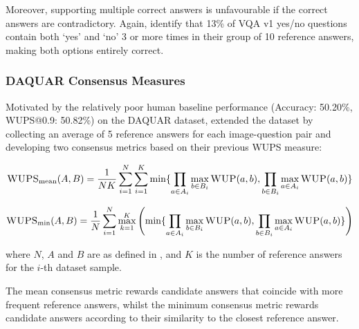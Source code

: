 Moreover, supporting multiple correct answers is unfavourable if the correct answers are contradictory. Again, \citeauthor{kafle2017visual} identify that 13\% of VQA v1 yes/no questions contain both `yes' and `no' 3 or more times in their group of 10 reference answers, making both options entirely correct.



\subsubsection{DAQUAR Consensus Measures}

Motivated by the relatively poor human baseline performance (Accuracy: 50.20\%, WUPS@0.9:  50.82\%) on the DAQUAR dataset, \citeauthor{malinowski2015ask} extended the dataset by collecting an average of 5 reference answers for each image-question pair and developing two consensus metrics based on their previous WUPS measure:

\begin{equation}
    \textsc{WUPS}_{\text{mean}}(A, B) =     \frac{1}{NK} \sum_{i=1}^N \sum_{i=1}^K \min \{\prod_{a \in A_i} \max_{b \in B_i} \textsc{WUP}(a, b), \prod_{b \in B_i} \max_{a \in A_i} \textsc{WUP}(a, b)\}
    \label{equation:wups_mean_consensus}
\end{equation}


\begin{equation}
    \textsc{WUPS}_{\text{min}}(A, B) =     \frac{1}{N} \sum_{i=1}^N \max_{k=1}^K \left( \min \{\prod_{a \in A_i} \max_{b \in B_i} \textsc{WUP}(a, b), \prod_{b \in B_i} \max_{a \in A_i} \textsc{WUP}(a, b)\} \right)
    \label{equation:wups_min_consensus}
\end{equation}

where \(N\), \(A\) and \(B\) are as defined in \equationautorefname{ \ref{equation:wups}}, and \(K\) is the number of reference answers for the \(i\)-th dataset sample.

The mean consensus metric rewards candidate answers that coincide with more frequent reference answers, whilst the minimum consensus metric rewards candidate answers according to their similarity to the closest reference answer.

